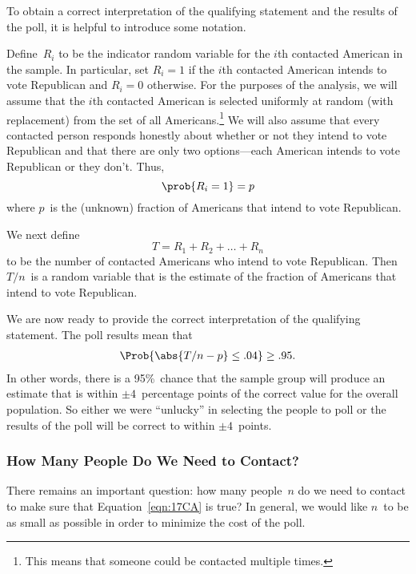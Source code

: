 To obtain a correct interpretation of the qualifying statement and the
results of the poll, it is helpful to introduce some notation.

Define~$R_i$ to be the indicator random variable for the $i$th
contacted American in the sample.  In particular, set $R_i = 1$ if the
$i$th contacted American intends to vote Republican and $R_i = 0$
otherwise.  For the purposes of the analysis, we will assume that the
$i$th contacted American is selected uniformly at random (with
replacement) from the set of all Americans.\footnote{This means that
someone could be contacted multiple times.}  We will also assume
that every contacted person responds honestly about whether or not
they intend to vote Republican and that there are only two
options---each American intends to vote Republican or they don't.
Thus,
\begin{equation}
    \prob{R_i = 1} = p
\end{equation}
where $p$~is the (unknown) fraction of Americans that intend to vote
Republican.

We next define
\begin{equation*}
    T = R_1 + R_2 + \dots + R_n
\end{equation*}
to be the number of contacted Americans who intend to vote
Republican.  Then $T/n$~is a random variable that is the estimate of
the fraction of Americans that intend to vote Republican.

We are now ready to provide the correct interpretation of the
qualifying statement.  The poll results mean that
\begin{equation}\label{eqn:17CA}
    \Prob{\strut \abs{T/n - p} \le .04} \ge .95.
\end{equation}
In other words, there is a 95\%~chance that the sample group will
produce an estimate that is within $\pm 4$~percentage points of the
correct value for the overall population.  So either we were
``unlucky'' in selecting the people to poll or the results of the poll
will be correct to within $\pm 4$~points.

\subsubsection{How Many People Do We Need to Contact?}

There remains an important question: how many people~$n$ do we need to
contact to make sure that Equation~\ref{eqn:17CA} is true?  In
general, we would like $n$~to be as small as possible in order to
minimize the cost of the poll.

